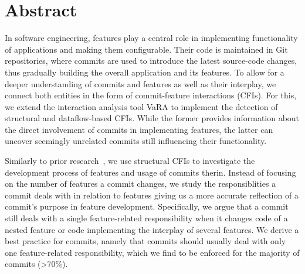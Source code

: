 \begingroup
\let\clearpage\relax
\let\cleardoublepage\relax
\let\cleardoublepage\relax

\chapter*{Abstract}

In software engineering, features play a central role in implementing functionality of applications and making them configurable. 
Their code is maintained in Git repositories, where commits are used to introduce the latest source-code changes, thus gradually building the overall application and its features. 
To allow for a deeper understanding of commits and features as well as their interplay, we connect both entities in the form of commit-feature interactions (CFIs).
For this, we extend the interaction analysis tool VaRA to implement the detection of structural and dataflow-based CFIs.
While the former provides information about the direct involvement of commits in implementing features, the latter can uncover seemingly unrelated commits still influencing their functionality.

Similarly to prior research~\cite{michelon2021lifecycle}, we use structural CFIs to investigate the development process of features and usage of commits therin.
Instead of focusing on the number of features a commit changes, we study the responsiblities a commit deals with in relation to features giving us a more accurate reflection of a commit's purpose in feature development.
Specifically, we argue that a commit still deals with a single feature-related responsibility when it changes code of a nested feature or code implementing the interplay of several features.
We derive a best practice for commits, namely that commits should usually deal with only one feature-related responsibility, which we find to be enforced for the majority of commits (>70\%).%


